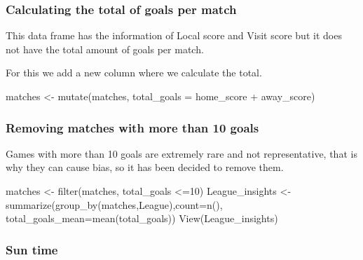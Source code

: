\documentclass[
]{article}
\newenvironment{Shaded}{\begin{snugshade}}{\end{snugshade}}
\newcommand{\AttributeTok}[1]{\textcolor[rgb]{0.77,0.63,0.00}{#1}}
\newcommand{\DecValTok}[1]{\textcolor[rgb]{0.00,0.00,0.81}{#1}}
\newcommand{\FunctionTok}[1]{\textcolor[rgb]{0.00,0.00,0.00}{#1}}
\newcommand{\NormalTok}[1]{#1}
\newcommand{\OtherTok}[1]{\textcolor[rgb]{0.56,0.35,0.01}{#1}}
\newcommand{\SpecialCharTok}[1]{\textcolor[rgb]{0.00,0.00,0.00}{#1}}
\begin{document}
\hypertarget{calculating-the-total-of-goals-per-match}{%
\subsubsection{Calculating the total of goals per
match}\label{calculating-the-total-of-goals-per-match}}

This data frame has the information of Local score and Visit score but
it does not have the total amount of goals per match.

For this we add a new column where we calculate the total.

\begin{Shaded}
\begin{Highlighting}[]
\NormalTok{matches }\OtherTok{\textless{}{-}} \FunctionTok{mutate}\NormalTok{(matches, }\AttributeTok{total\_goals =}\NormalTok{ home\_score }\SpecialCharTok{+}\NormalTok{ away\_score)}
\end{Highlighting}
\end{Shaded}

\hypertarget{removing-matches-with-more-than-10-goals}{%
\subsubsection{Removing matches with more than 10
goals}\label{removing-matches-with-more-than-10-goals}}

Games with more than 10 goals are extremely rare and not representative,
that is why they can cause bias, so it has been decided to remove them.

\begin{Shaded}
\begin{Highlighting}[]
\NormalTok{matches }\OtherTok{\textless{}{-}} \FunctionTok{filter}\NormalTok{(matches, total\_goals }\SpecialCharTok{\textless{}=}\DecValTok{10}\NormalTok{)}
\NormalTok{League\_insights }\OtherTok{\textless{}{-}}\FunctionTok{summarize}\NormalTok{(}\FunctionTok{group\_by}\NormalTok{(matches,League),}\AttributeTok{count=}\FunctionTok{n}\NormalTok{(), }\AttributeTok{total\_goals\_mean=}\FunctionTok{mean}\NormalTok{(total\_goals))}
\FunctionTok{View}\NormalTok{(League\_insights)}
\end{Highlighting}
\end{Shaded}

\hypertarget{sun-time}{%
\subsubsection{Sun time}\label{sun-time}}
\end{document}
